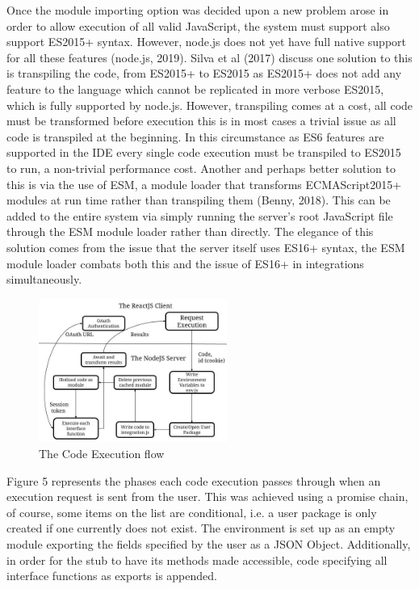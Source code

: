 \documentclass[jou,apacite]{apa6}
\begin{document}
			Once the module importing option was decided upon a new problem arose in order to allow execution of all valid JavaScript, the system must support also support ES2015+ syntax. However, node.js does not yet have full native support for all these features (node.js, 2019). Silva et al (2017)  discuss one solution to this is transpiling the code, from ES2015+ to ES2015 as ES2015+ does not add any feature to the language which cannot be replicated in more verbose ES2015, which is fully supported by node.js. However, transpiling comes at a cost, all code must be transformed before execution this is in most cases a trivial issue as all code is transpiled at the beginning. In this circumstance as ES6 features are supported in the IDE every single code execution must be transpiled to ES2015 to run, a non-trivial performance cost. Another and perhaps better solution to this is via the use of ESM, a module loader that transforms ECMAScript2015+ modules at run time rather than transpiling them (Benny, 2018). This can be added to the entire system via simply running the server's root JavaScript file through the ESM module loader rather than directly. The elegance of this solution comes from the issue that the server itself uses ES16+ syntax,  the ESM module loader combats both this and the issue of ES16+ in integrations simultaneously.
			
				\begin{figure}[h]
\caption{The Code Execution flow}
\centering
\includegraphics[width=0.55\textwidth]{codeexecution}
\end{figure}
			
			Figure 5 represents the phases each code execution passes through when an execution request is sent from the user. This was achieved using a promise chain, of course, some items on the list are conditional, i.e. a user package is only created if one currently does not exist. The environment is set up as an empty module exporting the fields specified by the user as a JSON Object. Additionally, in order for the stub to have its methods made accessible,  code specifying all interface functions as exports is appended.
\end{document}
